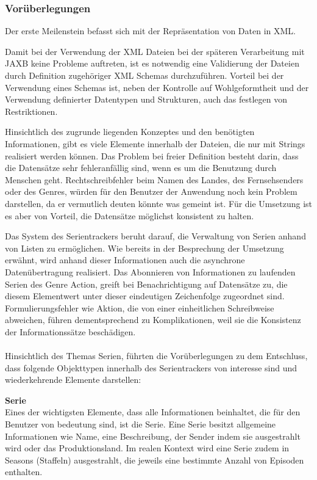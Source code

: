 \documentclass[a4paper]{article}
\begin{document}
\subsubsection{Vorüberlegungen}
Der erste Meilenstein befasst sich mit der Repräsentation von Daten in XML.

Damit bei der Verwendung der XML Dateien bei der späteren Verarbeitung mit JAXB keine Probleme auftreten,
ist es notwendig eine Validierung der Dateien durch Definition zugehöriger XML Schemas durchzuführen.
Vorteil bei der Verwendung eines Schemas ist, neben der Kontrolle auf Wohlgeformtheit und der Verwendung
definierter Datentypen und Strukturen, auch das festlegen von Restriktionen.

Hinsichtlich des zugrunde liegenden Konzeptes und den benötigten Informationen, gibt es viele Elemente
innerhalb der Dateien, die nur mit Strings realisiert werden können. Das Problem bei freier Definition
besteht darin, dass die Datensätze sehr fehleranfällig sind, wenn es um die Benutzung durch Menschen geht.
Rechtschreibfehler beim Namen des Landes, des Fernsehsenders oder des Genres, würden für den Benutzer der 
Anwendung noch kein Problem darstellen, da er vermutlich deuten könnte was gemeint ist.
Für die Umsetzung ist es aber von Vorteil, die Datensätze möglichst konsistent zu halten.

Das System des Serientrackers beruht darauf, die Verwaltung von Serien anhand von Listen zu ermöglichen. Wie bereits in der Besprechung der Umsetzung erwähnt, wird anhand dieser Informationen auch die asynchrone Datenübertragung realisiert. 
Das Abonnieren von Informationen zu laufenden Serien des Genre Action, greift bei Benachrichtigung auf
Datensätze zu, die diesem Elementwert unter dieser eindeutigen Zeichenfolge zugeordnet sind. Formulierungsfehler
wie Aktion, die von einer einheitlichen Schreibweise abweichen, führen dementsprechend zu Komplikationen, weil sie die Konsistenz der Informationssätze beschädigen. \\\\

Hinsichtlich des Themas Serien, führten die Vorüberlegungen zu dem Entschluss, dass folgende Objekttypen innerhalb des Serientrackers von interesse sind und wiederkehrende Elemente darstellen:

\textbf{Serie} \\
Eines der wichtigsten Elemente, dass alle Informationen beinhaltet, die für den Benutzer von bedeutung sind, ist die Serie. 
Eine Serie besitzt allgemeine Informationen wie Name, eine Beschreibung, der Sender indem sie ausgestrahlt wird oder das Produktionsland.
Im realen Kontext wird eine Serie zudem in Seasons (Staffeln) ausgestrahlt, die jeweils eine bestimmte Anzahl von Episoden enthalten.
\end{document}
